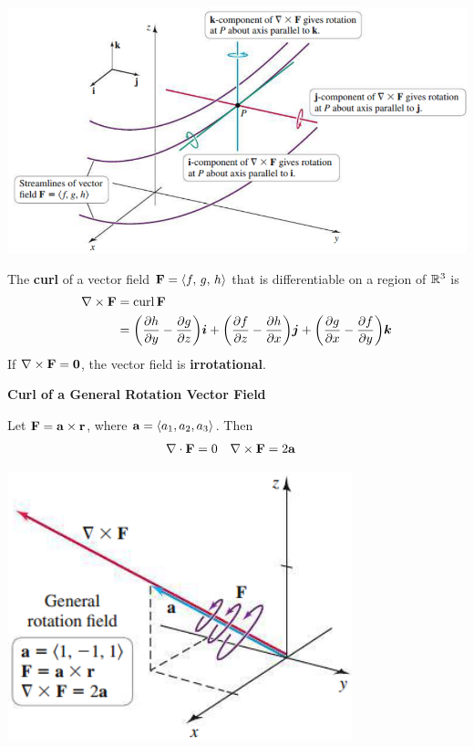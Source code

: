 \documentclass[../mathNotesPreamble]{subfiles}
\begin{document}
  \begin{flushright}
    \includegraphics[width=0.8\linewidth]{../images/briggs_17_05/fig17_40}
  \end{flushright}

  \begin{defn*}
    The \textbf{curl} of a vector field $\mathbf F={\left\langle f,\,g,\,h \right\rangle}$ that is differentiable on a region of $\mathbb{R}^3$ is
    \begin{align*}
      \nabla\times\mathbf F&=\operatorname{curl} \mathbf F\\
        &={\left(\frac{\partial h}{\partial y}-\frac{\partial g}{\partial z}\right)}{\bm{i}}+{\left(\frac{\partial f}{\partial z}-\frac{\partial h}{\partial x}\right)}{\bm{j}}+{\left(\frac{\partial g}{\partial x}-\frac{\partial f}{\partial y}\right)}{\bm{k}}
    \end{align*}
    If $\nabla\times\mathbf F=\mathbf{0}$, the vector field is \textbf{irrotational}.
  \end{defn*}
  \pagebreak

  \noindent
  \textbf{Curl of a General Rotation Vector Field}

  Let $\mathbf F={\mathbf{a}}\times{\mathbf{r}}$, where ${\mathbf{a}}={\left\langle a_1, a_2, a_3 \right\rangle}$. Then
  \begin{align*}
    \nabla\cdot\mathbf F&=0&
    \nabla\times\mathbf F&=2{\mathbf{a}}
  \end{align*}

  \begin{center}
    \includegraphics[width=0.5\linewidth]{../images/briggs_17_05/fig17_41}
  \end{center}
\end{document}
